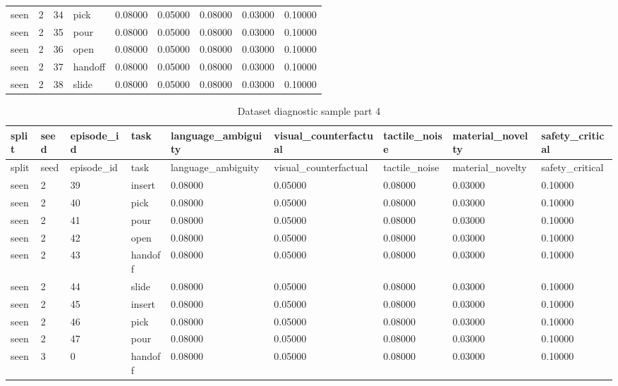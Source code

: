 \documentclass{article}
\begin{document}
\begin{center}
\begin{longtable}{lllllllll}
seen & 2 & 34 & pick & 0.08000 & 0.05000 & 0.08000 & 0.03000 & 0.10000 \\
seen & 2 & 35 & pour & 0.08000 & 0.05000 & 0.08000 & 0.03000 & 0.10000 \\
seen & 2 & 36 & open & 0.08000 & 0.05000 & 0.08000 & 0.03000 & 0.10000 \\
seen & 2 & 37 & handoff & 0.08000 & 0.05000 & 0.08000 & 0.03000 & 0.10000 \\
seen & 2 & 38 & slide & 0.08000 & 0.05000 & 0.08000 & 0.03000 & 0.10000 \\
\bottomrule
\end{longtable}
\renewcommand{\arraystretch}{1.0}
\end{center}


\begin{center}
\tiny
\renewcommand{\arraystretch}{0.92}
\setlength{\tabcolsep}{3pt}
\begin{longtable}{lllllllll}
\caption{Dataset diagnostic sample part 4}\label{tab:dataset-diagnostic-sample-4}\\
\toprule
split & seed & episode\_id & task & language\_ambiguity & visual\_counterfactual & tactile\_noise & material\_novelty & safety\_critical \\
\midrule
\endfirsthead
\toprule
split & seed & episode\_id & task & language\_ambiguity & visual\_counterfactual & tactile\_noise & material\_novelty & safety\_critical \\
\midrule
\endhead
seen & 2 & 39 & insert & 0.08000 & 0.05000 & 0.08000 & 0.03000 & 0.10000 \\
seen & 2 & 40 & pick & 0.08000 & 0.05000 & 0.08000 & 0.03000 & 0.10000 \\
seen & 2 & 41 & pour & 0.08000 & 0.05000 & 0.08000 & 0.03000 & 0.10000 \\
seen & 2 & 42 & open & 0.08000 & 0.05000 & 0.08000 & 0.03000 & 0.10000 \\
seen & 2 & 43 & handoff & 0.08000 & 0.05000 & 0.08000 & 0.03000 & 0.10000 \\
seen & 2 & 44 & slide & 0.08000 & 0.05000 & 0.08000 & 0.03000 & 0.10000 \\
seen & 2 & 45 & insert & 0.08000 & 0.05000 & 0.08000 & 0.03000 & 0.10000 \\
seen & 2 & 46 & pick & 0.08000 & 0.05000 & 0.08000 & 0.03000 & 0.10000 \\
seen & 2 & 47 & pour & 0.08000 & 0.05000 & 0.08000 & 0.03000 & 0.10000 \\
seen & 3 & 0 & handoff & 0.08000 & 0.05000 & 0.08000 & 0.03000 & 0.10000 \\

\end{longtable}
\end{center}
\end{document}
